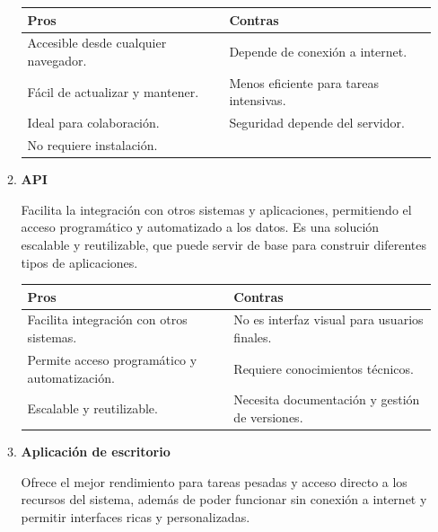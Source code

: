 \documentclass{article}
\begin{document}
\begin{enumerate}
\begin{enumerate}[label=\arabic*.]
    \medskip
    
    \begin{tabular}{p{6.5cm} p{6.5cm}}
    \hline
    \textbf{Pros} & \textbf{Contras} \\
    \hline
    Accesible desde cualquier navegador. & Depende de conexión a internet. \\
    Fácil de actualizar y mantener. & Menos eficiente para tareas intensivas. \\
    Ideal para colaboración. & Seguridad depende del servidor. \\
    No requiere instalación. &   \\

    \hline
    \end{tabular}
    \medskip
    
    \vspace{0.2cm}
    
    \item \textbf{API}
    
    Facilita la integración con otros sistemas y aplicaciones, permitiendo el acceso programático y automatizado a los datos. Es una solución escalable y reutilizable, que puede servir de base para construir diferentes tipos de aplicaciones.
    \vspace{0.2cm}
    
    \begin{tabular}{p{6.5cm} p{6.5cm}}
    \hline
    \textbf{Pros} & \textbf{Contras} \\
    \hline
    Facilita integración con otros sistemas. & No es interfaz visual para usuarios finales. \\
    Permite acceso programático y automatización. & Requiere conocimientos técnicos. \\
    Escalable y reutilizable. & Necesita documentación y gestión de versiones. \\
    \hline
    \end{tabular}
    \medskip
    
    \vspace{0.2cm}
    \item \textbf{Aplicación de escritorio}
    
    Ofrece el mejor rendimiento para tareas pesadas y acceso directo a los recursos del sistema, además de poder funcionar sin conexión a internet y permitir interfaces ricas y personalizadas.
    
    \medskip
    

\end{enumerate}
\end{enumerate}
\end{document}
